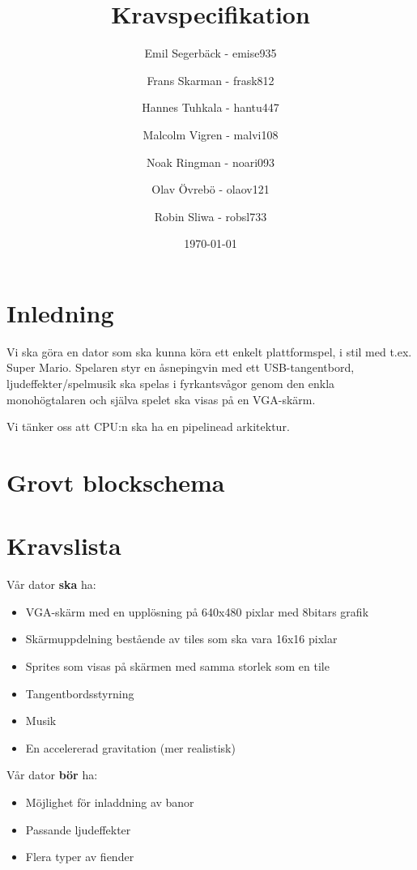 \documentclass[a4paper,titlepage]{article}
\author{
    Emil Segerbäck - emise935
    \and
    Frans Skarman - frask812
    \and
    Hannes Tuhkala - hantu447
    \and
    Malcolm Vigren - malvi108
    \and
    Noak Ringman - noari093
    \and
    Olav Övrebö - olaov121
    \and
    Robin Sliwa - robsl733}
\title{\textbf{Kravspecifikation}}
\date{\today}
\begin{document}
	\maketitle
	\newpage

\section{Inledning}
Vi ska göra en dator som ska kunna köra ett enkelt plattformspel, 
i stil med t.ex. Super Mario. Spelaren styr en åsnepingvin med ett USB-tangentbord,
ljudeffekter/spelmusik ska spelas i fyrkantsvågor genom den enkla 
monohögtalaren och själva spelet ska visas på en VGA-skärm.

Vi tänker oss att CPU:n ska ha en pipelinead arkitektur.

\section{Grovt blockschema}

\section{Kravslista}
Vår dator \textbf{ska} ha:
\begin{itemize}
    \item VGA-skärm med en upplösning på 640x480 pixlar med 8bitars grafik
    \item Skärmuppdelning bestående av tiles som ska vara 16x16 pixlar
    \item Sprites som visas på skärmen med samma storlek som en tile
	\item Tangentbordsstyrning
    \item Musik
    \item En accelererad gravitation (mer realistisk)
\end{itemize}
Vår dator \textbf{bör} ha:
\begin{itemize}
	\item Möjlighet för inladdning av banor
	\item Passande ljudeffekter 
	\item Flera typer av fiender
\end{itemize}
\end{document}
